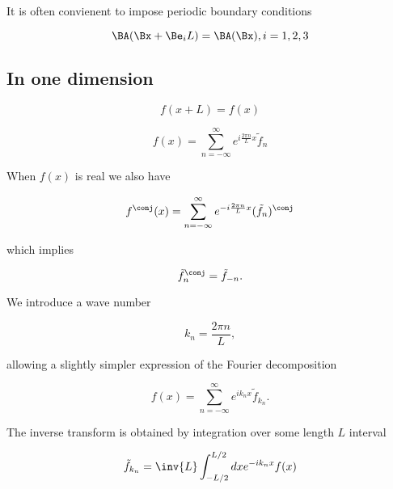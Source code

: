 It is often convienent to impose periodic boundary conditions

\begin{equation}\label{eqn:relativisticElectrodynamicsL15:170}
\BA(\Bx + \Be_i L) = \BA(\Bx), i = 1,2,3
\end{equation}

\subsection{In one dimension}

\begin{equation}\label{eqn:relativisticElectrodynamicsL15:190}
f(x + L) = f(x)
\end{equation}

\begin{equation}\label{eqn:relativisticElectrodynamicsL15:210}
f(x) = \sum_{n=-\infty}^\infty e^{i \frac{2 \pi n}{L} x} \tilde{f}_n
\end{equation}

When $f(x)$ is real we also have

\begin{equation}\label{eqn:relativisticElectrodynamicsL15:230}
f^\conj(x) = \sum_{n = -\infty}^\infty e^{-i \frac{2 \pi n}{L} x} (\tilde{f}_n)^\conj
\end{equation}

which implies

\begin{equation}\label{eqn:relativisticElectrodynamicsL15:250}
{\tilde{f}^\conj}_{n} = \tilde{f}_{-n}.
\end{equation}

We introduce a wave number

\begin{equation}\label{eqn:relativisticElectrodynamicsL15:270}
k_n = \frac{2 \pi n}{L},
\end{equation}

allowing a slightly simpler expression of the Fourier decomposition

\begin{equation}\label{eqn:relativisticElectrodynamicsL15:290}
f(x) = \sum_{n=-\infty}^\infty e^{i k_n x} \tilde{f}_{k_n}.
\end{equation}

The inverse transform is obtained by integration over some length $L$ interval

\begin{equation}\label{eqn:relativisticElectrodynamicsL15:310}
\tilde{f}_{k_n} = \inv{L} \int_{-L/2}^{L/2} dx e^{-i k_n x} f(x)
\end{equation}

